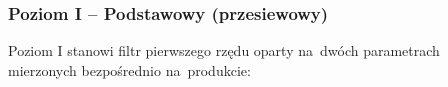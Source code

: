 


    


\subsubsection{Poziom I – Podstawowy (przesiewowy)}

Poziom I stanowi filtr pierwszego rzędu oparty na~dwóch
parametrach mierzonych bezpośrednio na~produkcie:

